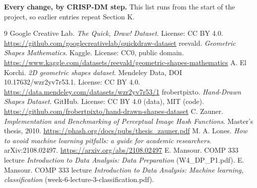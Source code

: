 \documentclass[11pt]{article}
\begin{document}
{\small{}}

\textbf{Every change, by CRISP-DM step.} This list runs from the start of the
project, so earlier entries repeat Section K.

{\small{}}

\begin{thebibliography}{9}
 Google Creative Lab. \emph{The Quick, Draw! Dataset}.
  License: CC BY 4.0.
  \url{https://github.com/googlecreativelab/quickdraw-dataset}
 reevald. \emph{Geometric Shapes Mathematics}.
  Kaggle. License: CC0, public domain.
  \url{https://www.kaggle.com/datasets/reevald/geometric-shapes-mathematics}
 A. El Korchi. \emph{2D geometric shapes dataset}.
  Mendeley Data, DOI 10.17632/wzr2yv7r53.1. License: CC BY 4.0.
  \url{https://data.mendeley.com/datasets/wzr2yv7r53/1}
 frobertpixto. \emph{Hand-Drawn Shapes Dataset}.
  GitHub. License: CC BY 4.0 (data), MIT (code).
  \url{https://github.com/frobertpixto/hand-drawn-shapes-dataset}
 C. Zauner. \emph{Implementation and Benchmarking of
  Perceptual Image Hash Functions}. Master's thesis, 2010.
  \url{https://phash.org/docs/pubs/thesis_zauner.pdf}
 M. A. Lones. \emph{How to avoid machine learning
  pitfalls: a guide for academic researchers}. arXiv:2108.02497.
  \url{https://arxiv.org/abs/2108.02497}
 E. Mansour. COMP 333 lecture \emph{Introduction to Data
  Analysis: Data Preparation} (W4\_DP\_P1.pdf).
 E. Mansour. COMP 333 lecture \emph{Introduction to Data
  Analysis: Machine learning, classification}
  (week-6-lecture-3-classification.pdf).
\end{thebibliography}
\end{document}
